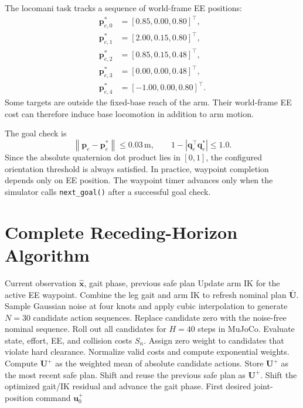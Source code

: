 \documentclass[11pt,a4paper]{article}
\newcommand{\norm}[1]{\left\lVert #1 \right\rVert}
\newcommand{\code}[1]{\texttt{#1}}
\begin{document}
The locomani task tracks a sequence of world-frame EE positions:
\begin{equation}
\begin{split}
  \bm{p}_{e,0}^{*}&=[0.85,0.00,0.80]^\top,\\
  \bm{p}_{e,1}^{*}&=[2.00,0.15,0.80]^\top,\\
  \bm{p}_{e,2}^{*}&=[0.85,0.15,0.48]^\top,\\
  \bm{p}_{e,3}^{*}&=[0.00,0.00,0.48]^\top,\\
  \bm{p}_{e,4}^{*}&=[-1.00,0.00,0.80]^\top.
\end{split}
\end{equation}
Some targets are outside the fixed-base reach of the arm. Their world-frame
EE cost can therefore induce base locomotion in addition to arm motion.

The goal check is
\begin{equation}
  \norm{\bm{p}_e-\bm{p}_e^*}\leq0.03\,\mathrm{m},
  \qquad
  1-\left|\bm{q}_e^\top\bm{q}_e^*\right|\leq1.0.
\end{equation}
Since the absolute quaternion dot product lies in $[0,1]$, the configured
orientation threshold is always satisfied. In practice, waypoint completion
depends only on EE position. The waypoint timer advances only when the
simulator calls \code{next\_goal()} after a successful goal check.

\section{Complete Receding-Horizon Algorithm}

\begin{algorithm}[ht]
\caption{\code{legged\_mani} locomani MPPI update}
\label{alg:locomani_mppi}
\begin{algorithmic}[1]
  \REQUIRE Current observation $\hat{\bm{x}}$, gait phase, previous safe plan
  \STATE Update arm IK for the active EE waypoint.
  \STATE Combine the leg gait and arm IK to refresh nominal plan
         $\bar{\bm{U}}$.
  \STATE Sample Gaussian noise at four knots and apply cubic interpolation to
         generate $N=30$ candidate action sequences.
  \STATE Replace candidate zero with the noise-free nominal sequence.
  \STATE Roll out all candidates for $H=40$ steps in MuJoCo.
  \STATE Evaluate state, effort, EE, and collision costs $S_n$.
  \STATE Assign zero weight to candidates that violate hard clearance.
    \STATE Normalize valid costs and compute exponential weights.
    \STATE Compute $\bm{U}^{+}$ as the weighted mean of absolute candidate
           actions.
    \STATE Store $\bm{U}^{+}$ as the most recent safe plan.
  \ELSE
    \STATE Shift and reuse the previous safe plan as $\bm{U}^{+}$.
  \ENDIF
  \STATE Shift the optimized gait/IK residual and advance the gait phase.
  \RETURN First desired joint-position command $\bm{u}^{+}_0$
\end{algorithmic}
\end{algorithm}
\end{document}
